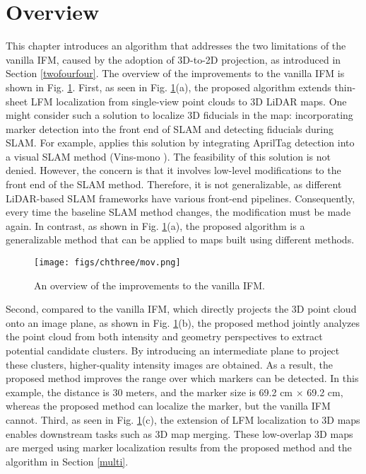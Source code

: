 \section{Overview} \label{4.1}
This chapter introduces an algorithm that addresses the two limitations of the vanilla IFM, caused by the adoption of 3D-to-2D projection, as introduced in Section \ref{twofourfour}. The overview of the improvements to the vanilla IFM is shown in Fig. \ref{mov}. First, as seen in Fig. \ref{mov}(a), the proposed algorithm extends thin-sheet LFM localization from single-view point clouds to 3D LiDAR maps. One might consider such a solution to localize 3D fiducials in the map: incorporating marker detection into the front end of SLAM and detecting fiducials during SLAM. For example, \cite{map3} applies this solution by integrating AprilTag \cite{ap3} detection into a visual SLAM method (Vins-mono \cite{vins}). The feasibility of this solution is not denied. However, the concern is that it involves low-level modifications to the front end of the SLAM method. Therefore, it is not generalizable, as different LiDAR-based SLAM frameworks \cite{traj,sdk} have various front-end pipelines. Consequently, every time the baseline SLAM method changes, the modification must be made again. In contrast, as shown in Fig. \ref{mov}(a), the proposed algorithm is a generalizable method that can be applied to maps built using different methods. \begin{figure}[H] 
	\centering
\texttt{[image: figs/chthree/mov.png]}
	\caption{An overview of the improvements to the vanilla IFM.}
	\label{mov}
\end{figure}
Second, compared to the vanilla IFM, which directly projects the 3D point cloud onto an image plane, as shown in Fig. \ref{mov}(b), the proposed method jointly analyzes the point cloud from both intensity and geometry perspectives to extract potential candidate clusters. By introducing an intermediate plane to project these clusters, higher-quality intensity images are obtained. As a result, the proposed method improves the range over which markers can be detected. In this example, the distance is 30 meters, and the marker size is 69.2 cm $\times$ 69.2 cm, whereas the proposed method can localize the marker, but the vanilla IFM cannot.
%
Third, as seen in Fig. \ref{mov}(c), the extension of LFM localization to 3D maps enables downstream tasks such as 3D map merging. These low-overlap 3D maps are merged using marker localization results from the proposed method and the algorithm in Section \ref{multi}.
